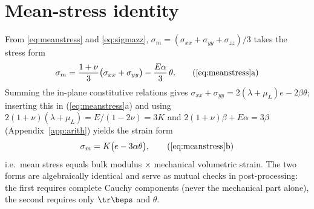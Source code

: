 \section{Mean-stress identity}
\label{sec:deriv:meanstress}
From \eqref{eq:meanstress} and \eqref{eq:sigmazz},
$\sigma_m=(\sigma_{xx}+\sigma_{yy}+\sigma_{zz})/3$ takes the stress form
\begin{equation}
\sigma_m=\frac{1+\nu}{3}\big(\sigma_{xx}+\sigma_{yy}\big)-\frac{E\alpha}{3}\,\theta .
\tag{\ref{eq:meanstress}a}
\end{equation}
Summing the in-plane constitutive relations gives
$\sigma_{xx}+\sigma_{yy}=2(\lambda+\mu_L)e-2\beta\theta$; inserting this in (\ref{eq:meanstress}a)
and using $2(1+\nu)(\lambda+\mu_L)=E/(1-2\nu)=3K$ and $2(1+\nu)\beta+E\alpha=3\beta$
(Appendix~\ref{app:arith}) yields the strain form
\begin{equation}
\sigma_m=K\big(e-3\alpha\theta\big),
\tag{\ref{eq:meanstress}b}
\end{equation}
i.e.\ mean stress equals bulk modulus $\times$ mechanical volumetric strain. The two forms are
algebraically identical and serve as mutual checks in post-processing: the first requires complete
Cauchy components (never the mechanical part alone), the second requires only
$\tr\beps$ and $\theta$.

